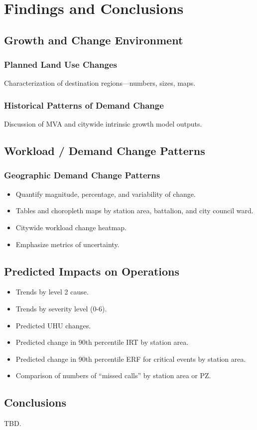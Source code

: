 \chapter{Findings and Conclusions}

\section{Growth and Change Environment}
\subsection{Planned Land Use Changes}
Characterization of destination regions—numbers, sizes, maps.

\subsection{Historical Patterns of Demand Change}
Discussion of MVA and citywide intrinsic growth model outputs.

\section{Workload / Demand Change Patterns}
\subsection{Geographic Demand Change Patterns}
\begin{itemize}
    \item Quantify magnitude, percentage, and variability of change.
    \item Tables and choropleth maps by station area, battalion, and city council ward.
    \item Citywide workload change heatmap.
    \item Emphasize metrics of uncertainty.
\end{itemize}

\section{Predicted Impacts on Operations}
\begin{itemize}
    \item Trends by level 2 cause.
    \item Trends by severity level (0-6).
    \item Predicted UHU changes.
    \item Predicted change in 90th percentile IRT by station area.
    \item Predicted change in 90th percentile ERF for critical events by station area.
    \item Comparison of numbers of “missed calls” by station area or PZ.
\end{itemize}

\section{Conclusions}
TBD.
